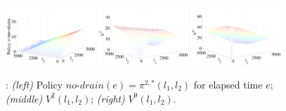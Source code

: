 \begin{figure}[tbp!]
\vspace{-2mm}
\centering
\includegraphics[width=0.3\textwidth]{new_pics/policy-iteration2-3.pdf}
\includegraphics[width=0.3\textwidth]{new_pics/V2.pdf}
\includegraphics[width=0.3\textwidth]{new_pics/V9.pdf}
\vspace{-3mm}
\caption{\footnotesize 
\WaterReservoir: 
{\it (left)} Policy $\mathit{no}$-$\mathit{drain}(e)=\pi^{2,*}(l_1,l_2)$ 
for elapsed time $e$; 
{\it (middle)} $V^2(l_1,l_2)$; 
{\it (right)} $V^9(l_1,l_2)$.
}
\label{fig:v2plots}
\vspace{-4mm}
\end{figure}


